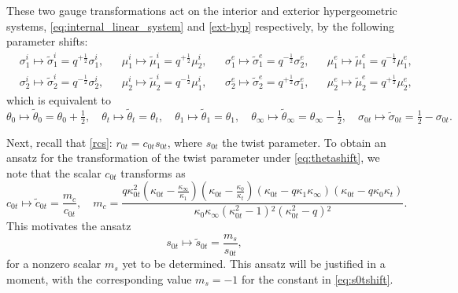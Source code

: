 \documentclass[a4paper,reqno,11pt]{amsart}
\numberwithin{equation}{section}
\numberwithin{figure}{section}
\theoremstyle{plain}
\theoremstyle{remark}
\numberwithin{rhp}{section}
\begin{document}
These two gauge transformations act on the interior and exterior hypergeometric systems, \eqref{eq:internal_linear_system} and \eqref{ext-hyp} respectively, by the following parameter shifts:
\begin{align*}
     &\sigma_1^i\mapsto \widetilde{\sigma}_1^i=q^{+\frac{1}{2}}\sigma_1^i, & &\mu_1^i\mapsto \widetilde{\mu}_1^i=q^{+\frac{1}{2}}\mu_2^i, & &\sigma_1^e\mapsto \widetilde{\sigma}_1^e=q^{-\frac{1}{2}}\sigma_2^e, & &\mu_1^e\mapsto \widetilde{\mu}_1^e=q^{-\frac{1}{2}}\mu_1^e,\\
  &\sigma_2^i\mapsto \widetilde{\sigma}_2^i=q^{-\frac{1}{2}}\sigma_2^i, & &\mu_2^i\mapsto \widetilde{\mu}_2^i=q^{-\frac{1}{2}}\mu_1^i, & &\sigma_2^e\mapsto \widetilde{\sigma}_2^e=q^{+\frac{1}{2}}\sigma_1^e, & &\mu_2^e\mapsto \widetilde{\mu}_2^e=q^{+\frac{1}{2}}\mu_2^e,
\end{align*}
which is equivalent to
\begin{equation}\label{eq:thetashift}
   \theta_0\mapsto \widetilde{\theta}_0=\theta_0+\tfrac{1}{2},\quad
   \theta_t\mapsto \widetilde{\theta}_t=\theta_t,\quad
   \theta_1\mapsto \widetilde{\theta}_1=\theta_1,\quad
   \theta_\infty\mapsto \widetilde{\theta}_\infty=\theta_\infty-\tfrac{1}{2},\quad \sigma_{0t}\mapsto \widetilde{\sigma}_{0t}=\tfrac{1}{2}-\sigma_{0t}.
\end{equation}

Next, recall that \eqref{rcs}: $r_{0t}=c_{0t}s_{0t}$, where $s_{0t}$ the twist parameter. To obtain an ansatz for the transformation of the twist parameter under \eqref{eq:thetashift}, we note that the scalar $c_{0t}$ transforms as
\begin{equation*}
    c_{0t}\mapsto\widetilde{c}_{0t}=\frac{m_c}{c_{0t}},\quad
    m_c=\frac{q \kappa_{0t}^2 \left(\kappa_{0t}-\frac{\kappa _{\infty }}{\kappa _1}\right) \left(\kappa_{0t}-\frac{\kappa _0}{\kappa _t}\right) \left(\kappa_{0t}-q\kappa _1 \kappa _{\infty }\right) \left(\kappa_{0t}-q\kappa _0 \kappa _t\right)}{\kappa _0 \kappa _{\infty } \left(\kappa_{0t}^2-1\right){}^2 \left(\kappa_{0t}^2-q\right){}^2}.
\end{equation*}
This motivates the ansatz
\begin{equation}\label{eq:s0tshift}
    s_{0t}\mapsto\widetilde{s}_{0t}=\frac{m_s}{s_{0t}},
\end{equation}
for a nonzero scalar $m_s$ yet to be determined. This ansatz will be justified in a moment, with the corresponding value $m_s=-1$ for the constant in \eqref{eq:s0tshift}.
\end{document}
